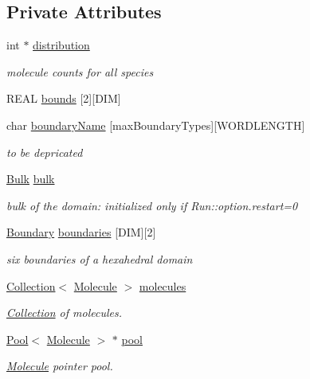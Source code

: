 \subsection*{Private Attributes}
\begin{CompactItemize}
\item 
int $\ast$ \hyperlink{classDomain_a5fcd6dd2bde60ea042f2556862d532d}{distribution}
\begin{CompactList}\small\item\em molecule counts for all species \item\end{CompactList}\item 
REAL \hyperlink{classDomain_a7d71bbeda0ebb856c37e8deef6db9b2}{bounds} \mbox{[}2\mbox{]}\mbox{[}DIM\mbox{]}
\item 
char \hyperlink{classDomain_140781c8fcb1a5176ad70097379d9021}{boundaryName} \mbox{[}maxBoundaryTypes\mbox{]}\mbox{[}WORDLENGTH\mbox{]}
\begin{CompactList}\small\item\em to be depricated \item\end{CompactList}\item 
\hyperlink{classBulk}{Bulk} \hyperlink{classDomain_fbf03c1d162803247825d76ab12b8f36}{bulk}
\begin{CompactList}\small\item\em bulk of the domain: initialized only if Run::option.restart=0 \item\end{CompactList}\item 
\hyperlink{structBoundary}{Boundary} \hyperlink{classDomain_160ecf16968a52e57d29a1679118bfc2}{boundaries} \mbox{[}DIM\mbox{]}\mbox{[}2\mbox{]}
\begin{CompactList}\small\item\em six boundaries of a hexahedral domain \item\end{CompactList}\item 
\hyperlink{classCollection}{Collection}$<$ \hyperlink{classMolecule}{Molecule} $>$ \hyperlink{classDomain_a685b2d61313732d3f787186f900bac0}{molecules}
\begin{CompactList}\small\item\em \hyperlink{classCollection}{Collection} of molecules. \item\end{CompactList}\item 
\hyperlink{structPool}{Pool}$<$ \hyperlink{classMolecule}{Molecule} $>$ $\ast$ \hyperlink{classDomain_270c6f9b44dde16bd8a993f9dd6e63ba}{pool}
\begin{CompactList}\small\item\em \hyperlink{classMolecule}{Molecule} pointer pool. \item\end{CompactList}\end{CompactItemize}


